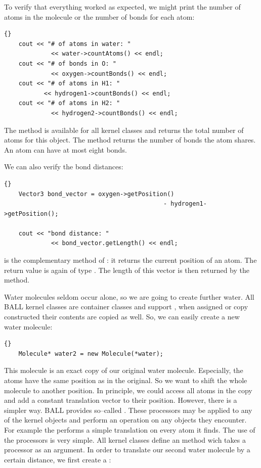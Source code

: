 \noindent
To verify that everything worked as expected, we might print the number of
atoms in the molecule or the number of bonds for each atom:
	
\begin{lstlisting}{}
	cout << "# of atoms in water: " 
 			 << water->countAtoms() << endl;
	cout << "# of bonds in O: " 
			 << oxygen->countBonds() << endl;
	cout << "# of atoms in H1: " 
		   << hydrogen1->countBonds() << endl;
	cout << "# of atoms in H2: " 
			 << hydrogen2->countBonds() << endl;
\end{lstlisting}

\noindent
The method  is available for all kernel classes and returns
the total number of atoms for this object. The method 
returns the number of bonds the atom shares. An atom can have at most eight
bonds.

We can also verify the bond distances:
\begin{lstlisting}{}
	Vector3 bond_vector = oxygen->getPosition() 
										    - hydrogen1->getPosition();

	cout << "bond distance: " 
			 << bond_vector.getLength() << endl;
\end{lstlisting}
	
\noindent
{} is the complementary method of : it
returns the current position of an atom. The return value is again of type
. The length of this vector is then returned by the
 method. 

Water molecules seldom occur alone, so we are going to create further water.
All BALL kernel classes are container classes and support , \ie when assigned or copy constructed their contents are copied as
well. So, we can easily create a new water molecule:

\begin{lstlisting}{}
	Molecule* water2 = new Molecule(*water);
\end{lstlisting}
	
\noindent
This molecule is an exact copy of our original water molecule. Especially, the
atoms have the same position as in the original. So we want to shift the whole
molecule to another position.  In principle, we could access all atoms in the
copy and add a constant translation vector to their position. However, there
is a simpler way. BALL provides so--called . These
processors may be applied to any of the kernel objects and perform an
operation on any objects they encounter. For example the
 performs a simple translation on every atom it
finds. The use of the processors is very simple.  All kernel classes define an
 method wich takes a processor as an argument. In order to
translate our second water molecule by a certain distance, we first create a
:

